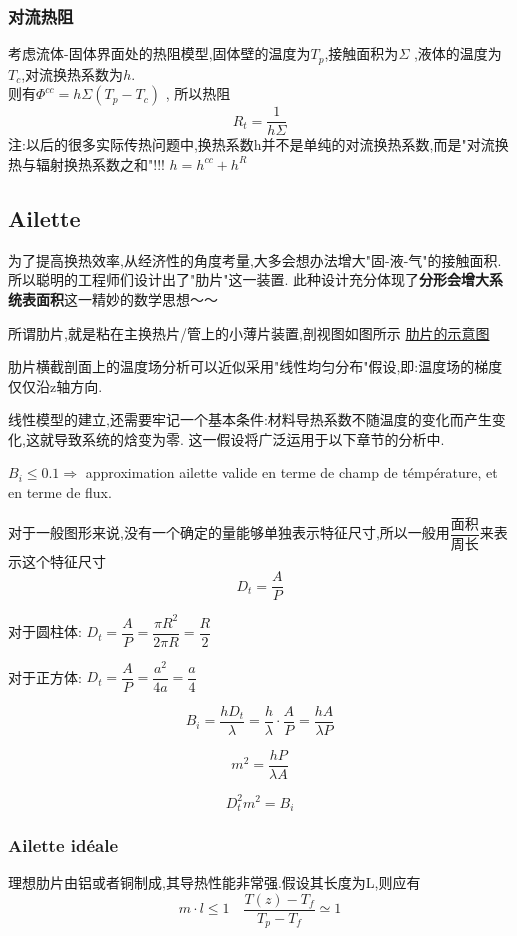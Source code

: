 \documentclass{article}
\begin{document}
\subsubsection{对流热阻}
考虑流体-固体界面处的热阻模型,固体壁的温度为$T_p$,接触面积为$\Sigma$ ,液体的温度为$T_c$,对流换热系数为$h$.\\
则有$\Phi^{cc} = h\Sigma(T_p - T_c)$ , 所以热阻
$$R_t = \dfrac{1}{h\Sigma}$$
注:以后的很多实际传热问题中,换热系数h并不是单纯的对流换热系数,而是"对流换热与辐射换热系数之和"!!! $h=h^{cc} + h^R$

\subsection{Ailette}
为了提高换热效率,从经济性的角度考量,大多会想办法增大"固-液-气"的接触面积.
所以聪明的工程师们设计出了"肋片"这一装置.
此种设计充分体现了\textbf{分形会增大系统表面积}这一精妙的数学思想～～

所谓肋片,就是粘在主换热片/管上的小薄片装置,剖视图如图所示
\href{http://i.imgbox.com/UBJtc7TX.png}{肋片的示意图}

肋片横截剖面上的温度场分析可以近似采用"线性均匀分布"假设,即:温度场的梯度仅仅沿z轴方向.

线性模型的建立,还需要牢记一个基本条件:材料导热系数不随温度的变化而产生变化,这就导致系统的焓变为零.
这一假设将广泛运用于以下章节的分析中.

$B_i \leq 0.1 \Rightarrow$ approximation ailette valide en terme de champ de t\'emp\'erature, et en terme de flux.

对于一般图形来说,没有一个确定的量能够单独表示特征尺寸,所以一般用$\dfrac{\text{面积}}{\text{周长}}$来表示这个特征尺寸\\

$$D_t = \frac{A}{P}$$

对于圆柱体: $D_t = \dfrac{A}{P} = \dfrac{\pi R^2}{2 \pi R} = \dfrac{R}{2}$

对于正方体: $D_t = \dfrac{A}{P} = \dfrac{a^2}{4a} = \dfrac{a}{4}$

$$ B_i = \frac{h D_t}{\lambda} = \frac{h}{\lambda} \cdot \frac{A}{P} = \frac{hA}{\lambda P}$$

$$ m^2 = \frac{hP}{\lambda A}$$
\textbf{}

$$ D_t^2 m^2 = B_i$$

\subsubsection{Ailette id\'eale}
理想肋片由铝或者铜制成,其导热性能非常强.假设其长度为L,则应有
$$ m\cdot l \leq 1 \quad \frac{T(z)-T_f}{T_p - T_f} \simeq 1 $$
\end{document}
